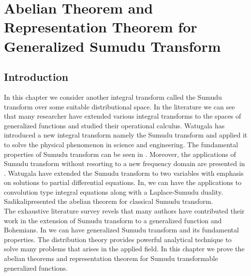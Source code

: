 

\chapter{Abelian Theorem and Representation Theorem  for Generalized Sumudu Transform}

\section{Introduction}
In this chapter we consider another integral transform called the Sumudu transform over some suitable distributional space. In the literature we can see that many researcher have extended various integral transforms to the spaces of generalized functions and studied their operational calculus. Watugala\cite{R90} has introduced a new integral transform namely the Sumudu transform and applied it to solve the physical phenomenon in science and engineering. The fundamental properties of Sumudu transform can be seen in \cite{R89,R90,R91,R95,R96}. Moreover, the applications of Sumudu transform without resorting to a new frequency domain are presented in \cite{R5,R6,R7,R11,R16,R17,R42,R43,R44}. Watugala\cite{R91} have extended the Sumudu transform to two variables with emphasis on solutions to partial differential equations. In\cite{R10}, we can have the applications to convolution type integral equations along with a Laplace-Sumudu duality. Sadikali\cite{R69}presented the abelian theorem for classical Sumudu transform.\\
The  exhaustive literature survey revels that many authors have contributed their work in the extension of Sumudu transform to a generalized function and Bohemians. In \cite{R42,R81} we can have generalized Sumudu transform and its fundamental properties. The distribution theory provides powerful analytical technique to solve many problems that arises in the applied field. In this chapter we prove the abelian theorems and representation theorem for Sumudu transformable generalized functions.
